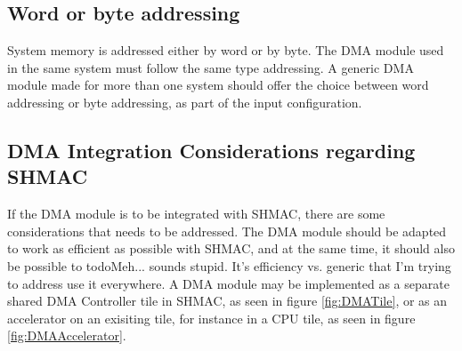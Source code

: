 %

\subsection{Word or byte addressing}
System memory is addressed either by word or by byte.
The DMA module used in the same system must follow the same type addressing.
A generic DMA module made for more than one system should offer the choice between word addressing or byte addressing, as part of the input configuration.

\subsection{DMA Integration Considerations regarding SHMAC}

If the DMA module is to be integrated with SHMAC, there are some considerations that needs to be addressed.
The DMA module should be adapted to work as efficient as possible with SHMAC, and at the same time, it should also be possible to todo{Meh... sounds stupid. It's efficiency vs. generic that I'm trying to address} use it everywhere. 
A DMA module may be implemented as a separate shared DMA Controller tile in SHMAC, as seen in figure \ref{fig:DMATile}, or as an accelerator on an exisiting tile, for instance in a CPU tile, as seen in figure \ref{fig:DMAAccelerator}.


